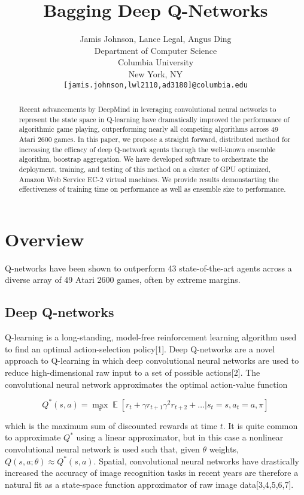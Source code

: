 \documentclass{article} %
\title{Bagging Deep Q-Networks}
\author{
Jamis Johnson, Lance Legal, Angus Ding \\
Department of Computer Science\\
Columbia University \\
New York, NY\\
\texttt{[jamis.johnson,lwl2110,ad3180]@columbia.edu} \\
}
\DeclareMathOperator{\E}{\mathbb{E}}
\begin{document}
\maketitle

\begin{abstract}
Recent advancements by DeepMind in leveraging convolutional neural networks to 
represent the state space in Q-learning have dramatically improved the performance 
of algorithmic game playing, outperforming nearly all competing algorithms across 49
Atari 2600 games. In this paper, we propose a straight forward, distributed method for 
increasing the efficacy of deep Q-network agents thorugh the well-known ensemble algorithm,
boostrap aggregation. We have developed software to orchestrate the deployment, training, 
and testing of this method on a cluster of GPU optimized, Amazon Web Service EC-2 
virtual machines. We provide results demonstarting the effectiveness of training time
on performance as well as ensemble size to performance.
\end{abstract}

\section{Overview}
Q-networks have been shown to outperform 43 state-of-the-art agents across a 
diverse array of 49 Atari 2600 games, often by extreme margins.

\subsection{Deep Q-networks}
Q-learning is a long-standing, model-free reinforcement learning algorithm used to find 
an optimal action-selection policy[1]. Deep Q-networks are a novel approach to 
Q-learning in which deep convolutional neural networks are used to reduce high-dimensional 
raw input to a set of possible actions[2]. The convolutional neural network approximates the 
optimal action-value function

\[
Q^*(s,a) = \max_{\pi} \E \left[ r_t + \gamma r_{t+1} \gamma^2 r_{t+2} + \dots | s_t = s, a_t = a, \pi \right]
\]

which is the maximum sum of discounted rewards at time $t$. It is quite common 
to approximate $Q^*$ using a linear approximator, but in this case a 
nonlinear convolutional neural network is used such that, given $\theta$ weights, 
$Q(s,a;\theta) \approx Q^*(s,a)$. Spatial, convolutional neural networks have drastically increased 
the accuracy of image recognition tasks in recent years are therefore a natural fit as a 
state-space function approximator of raw image data[3,4,5,6,7].
\end{document}
